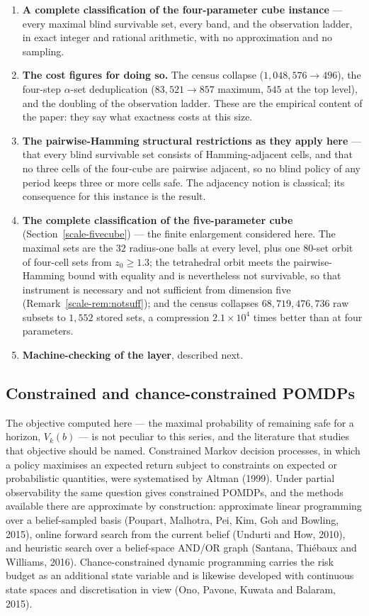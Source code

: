 \documentclass[10pt,twocolumn]{article}
\theoremstyle{plain}
\theoremstyle{definition}
\theoremstyle{remark}
\begin{document}
\begin{enumerate}
\item \textbf{A complete classification of the four-parameter cube instance} --- every
  maximal blind survivable set, every band, and the observation ladder, in exact integer
  and rational arithmetic, with no approximation and no sampling.
\item \textbf{The cost figures for doing so.} The census collapse
  (\(1{,}048{,}576 \to 496\)), the four-step \(\alpha\)-set deduplication
  (\(83{,}521 \to 857\) maximum, \(545\) at the top level), and the doubling of the observation ladder. These are the
  empirical content of the paper: they say what exactness costs at this size.
\item \textbf{The pairwise-Hamming structural restrictions as they apply here} --- that
  every blind survivable set consists of Hamming-adjacent cells, and that no three cells of
  the four-cube are pairwise adjacent, so no blind policy of any period keeps three or more
  cells safe. The adjacency notion is classical; its consequence for this instance is the
  result.
\item \textbf{The complete classification of the five-parameter cube}
  (Section~\ref{scale-fivecube}) --- the finite enlargement considered here. The
  maximal sets are the \(32\) radius-one balls at every level, plus one \(80\)-set orbit of
  four-cell sets from \(z_{0} \ge 1.3\); the tetrahedral orbit meets the pairwise-Hamming bound
  with equality and is nevertheless not survivable, so that instrument is necessary and not
  sufficient from dimension five (Remark~\ref{scale-rem:notsuff}); and the census collapses
  \(68{,}719{,}476{,}736\) raw subsets to \(1{,}552\) stored sets, a compression
  \(2.1 \times 10^{4}\) times better than at four parameters.
\item \textbf{Machine-checking of the layer}, described next.
\end{enumerate}

\subsection{Constrained and chance-constrained POMDPs}
\label{scale-cpomdp}

The objective computed here --- the maximal probability of remaining safe for a horizon,
\(V_k(b)\) --- is not peculiar to this series, and the literature that studies that
objective should be named. Constrained Markov decision processes, in which a policy
maximises an expected return subject to constraints on expected or probabilistic
quantities, were systematised by Altman (1999). Under partial observability the same
question gives constrained POMDPs, and the methods available there are approximate by
construction: approximate linear programming over a belief-sampled basis (Poupart,
Malhotra, Pei, Kim, Goh and Bowling, 2015), online forward search from the current belief
(Undurti and How, 2010), and heuristic search over a belief-space AND/OR graph (Santana,
Thi\'ebaux and Williams, 2016). Chance-constrained dynamic programming carries the risk
budget as an additional state variable and is likewise developed with continuous state
spaces and discretisation in view (Ono, Pavone, Kuwata and Balaram, 2015).
\end{document}
